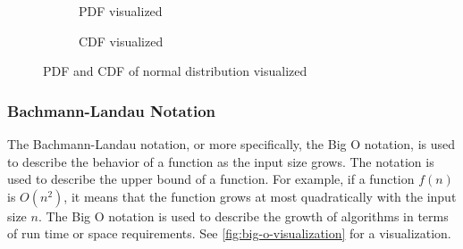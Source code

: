 \begin{figure}[H]
  \begin{subfigure}[b]{0.4\textwidth}
    \centering
    \caption{PDF visualized}
    \label{fig:pdf-theory}
  \end{subfigure}
  \hfill
  \begin{subfigure}[b]{0.4\textwidth}
    \centering
    \caption{CDF visualized}
    \label{fig:cdf-theory}
  \end{subfigure}
  \caption{\gls{PDF} and \gls{CDF} of normal distribution visualized}
  \label{fig:probability-theory}
\end{figure}

\subsubsection{Bachmann-Landau Notation}

The Bachmann-Landau notation, or more specifically, the Big O notation, is used to describe the behavior of a function as the input size grows. The notation is used to describe the upper bound of a function. For example, if a function $f(n)$ is $O(n^2)$, it means that the function grows at most quadratically with the input size $n$. The Big O notation is used to describe the growth of algorithms in terms of run time or space requirements. See \autoref{fig:big-o-visualization} for a visualization.


